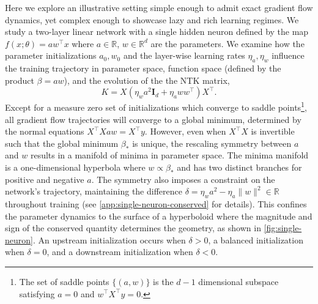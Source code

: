 \documentclass{article}
\theoremstyle{plain}
\theoremstyle{definition}
\theoremstyle{remark}
\begin{document}
Here we explore an illustrative setting simple enough to admit exact gradient flow dynamics, yet complex enough to showcase lazy and rich learning regimes.
%
We study a two-layer linear network with a single hidden neuron defined by the map $f(x;\theta) = a w^\intercal x$ where $a \in \mathbb{R}$, $w \in \mathbb{R}^d$ are the parameters.
%
We examine how the parameter initializations $a_0, w_0$ and the layer-wise learning rates $\eta_{a}, \eta_{w}$ influence the training trajectory in parameter space, function space (defined by the product $\beta = aw$), and the evolution of the the NTK matrix,
%
\begin{equation}
    \label{eq:single-neuron-NTK-matrix}
    K = X \left(\eta_wa^2 \mathbf{I}_d + \eta_aww^\intercal\right)X^\intercal.
\end{equation}
%
Except for a measure zero set of initializations which converge to saddle points\footnote{The set of saddle points $\{(a,w)\}$ is the $d-1$ dimensional subspace satisfying $a = 0$ and $w^\intercal X^\intercal y = 0$.}, all gradient flow trajectories will converge to a global minimum, determined by the normal equations $X^\intercal X aw = X^\intercal y$.
%
However, even when $X^\intercal X$ is invertible such that the global minimum $\beta_*$ is unique, the rescaling symmetry between $a$ and $w$ results in a manifold of minima in parameter space.
%
The minima manifold is a one-dimensional hyperbola where $w \propto \beta_*$ and has two distinct branches for positive and negative $a$.
%
The symmetry also imposes a constraint on the network's trajectory, maintaining the difference $\delta = \eta_wa^2 - \eta_a\|w\|^2 \in \mathbb{R}$ throughout training (see \cref{app:single-neuron-conserved} for details).
%
This confines the parameter dynamics to the surface of a hyperboloid where the magnitude and sign of the conserved quantity determines the geometry, as shown in \cref{fig:single-neuron}.
%
An upstream initialization occurs when $\delta > 0$, a balanced initialization when $\delta = 0$, and a downstream initialization when $\delta < 0$.
\end{document}
